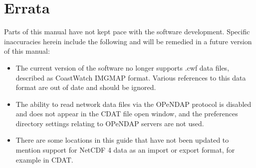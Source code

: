 \chapter*{Errata}

Parts of this manual have not kept pace with the software development.
Specific inaccuracies herein include the following and will be remedied in
a future version of this manual:
\begin{itemize}

\item The current version of the software no longer supports .cwf data files,
described as CoastWatch IMGMAP format.  Various references to this data
format are out of date and should be ignored.

\item The ability to read network data files via the OPeNDAP protocol is
disabled and does not appear in the CDAT file open window, and
the preferences directory settings relating to OPeNDAP servers are not used.

\item There are some locations in this guide that have not been updated to
mention support for NetCDF 4 data as an import or export format, for example
in CDAT.

\end{itemize}

\thispagestyle{empty}

\newpage
